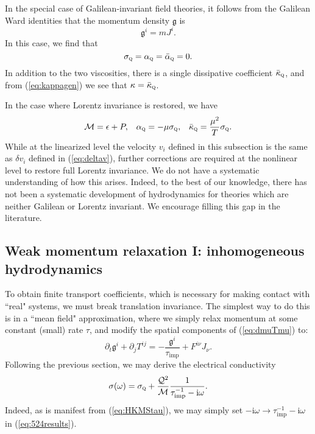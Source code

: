 \documentclass[10pt, oneside]{book}
\begin{document}
\begin{doublespace}
In the special case of Galilean-invariant field theories, it follows from the Galilean Ward identities that the momentum density $\mathfrak{g}$ is \begin{equation}
\mathfrak{g}^i = m J^i .
\end{equation}
In this case, we find that \begin{equation}
\sigma_{\textsc{q}} = \alpha_{\textsc{q}} = \bar\alpha_{\textsc{q}}=0.
\end{equation}
In addition to the two viscosities, there is a single dissipative coefficient $\bar\kappa_{\textsc{q}}$, and from (\ref{eq:kappagen}) we see that $\kappa = \bar\kappa_{\textsc{q}}$.

In the case where Lorentz invariance is restored, we have \begin{equation}
\mathcal{M} = \epsilon+P, \;\;\; \alpha_{\textsc{q}} = -\mu \sigma_{\textsc{q}}, \;\;\; \bar\kappa_{\textsc{q}} = \frac{\mu^2}{T}\sigma_{\textsc{q}}.  \label{eq:385}
\end{equation}
While at the linearized level the velocity $v_i$ defined in this subsection is the same as $\delta v_i$ defined in (\ref{eq:deltav}), further corrections are required at the nonlinear level to restore full Lorentz invariance.   We do not have a systematic understanding of how this arises.   Indeed, to the best of our knowledge, there has not been a systematic development of hydrodynamics for theories which are neither Galilean or Lorentz invariant.   We encourage filling this gap in the literature.

\subsection{Weak momentum relaxation I: inhomogeneous hydrodynamics}
To obtain finite transport coefficients, which is necessary for making contact with ``real" systems, we must break translation invariance.    The simplest way to do this is in a ``mean field" approximation, where we simply relax momentum at some constant (small) rate $\tau$, and modify the spatial components of (\ref{eq:dmuTmu}) to: \cite{hkms} \begin{equation}
\partial_t \mathfrak{g}^i + \partial_j T^{ij} = -\frac{\mathfrak{g}^i}{\tau_{\mathrm{imp}}} + F^{i\nu}J_\nu.  \label{eq:HKMStau}
\end{equation}
Following the previous section, we may derive the electrical conductivity  \begin{equation}
\sigma(\omega) = \sigma_{\textsc{q}} + \frac{\mathcal{Q}^2}{\mathcal{M} } \frac{1}{\tau_{\mathrm{imp}}^{-1}-\mathrm{i}\omega}.  \label{eq:hkmssigma}
\end{equation}
Indeed, as is manifest from (\ref{eq:HKMStau}), we may simply set $-\mathrm{i}\omega \rightarrow \tau_{\mathrm{imp}}^{-1} - \mathrm{i}\omega$ in (\ref{eq:524results}).


\end{doublespace}
\end{document}
